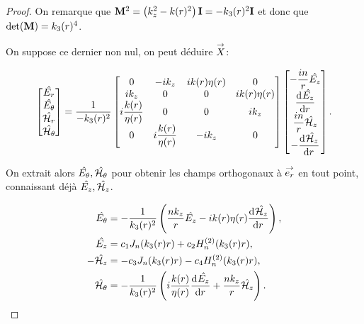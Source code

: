 \begin{proof}
      On remarque que \(\mM^2 = \left(k_z^2 - k(r)^2\right)\mI=-k_3(r)^2\mI\) et donc que \(\det(\mat{M}) = k_3(r)^4\).


      On suppose ce dernier non nul, on peut déduire \(\vect{X}\):

      \begin{equation*}
        \begin{bmatrix}
          \hat{E_r}\\
          \hat{E_\theta}\\
          \hat{\cH_r}\\
          \hat{\cH_\theta}
        \end{bmatrix} =
        \frac{1}{-k_3(r)^2}
        \begin{bmatrix}
        0 & -ik_z & ik(r)\eta(r) & 0
        \\
        ik_z & 0 & 0 & ik(r)\eta(r)
        \\
        i\frac{k(r)}{\eta(r)} & 0 & 0 & ik_z
        \\
        0 & i\frac{k(r)}{\eta(r)} & -ik_z & 0
        \end{bmatrix}
        \begin{bmatrix}
          -\frac{in}{r}\hat{E_z}\\
          \ddp{r}{\hat{E_z}}\\
          \frac{in}{r}\hat{\cH_z}\\
          -\ddp{r}{\hat{\cH_z}}
        \end{bmatrix}.
      \end{equation*}

      On extrait alors \(\hat{E_\theta}, \hat{\cH_\theta}\) pour obtenir les champs orthogonaux à \(\vect{e_r}\) en tout point, connaissant déjà \(\hat{E_z}, \hat{\cH_z}\).

      \begin{align*}
        \hat{E_\theta} &= -\frac{1}{k_3(r)^2}\left(\frac{nk_z}{r}\hat{E_z} - ik(r)\eta(r)\ddp{r}{\hat{\cH_z}}\right),
        \\
        \hat{E_z} &= c_1 J_n(k_3(r) r) + c_2 H_n^{(2)}(k_3(r) r),
        \\
        -\hat{\cH_z} &= -c_3 J_n(k_3(r) r) - c_4 H_n^{(2)}(k_3(r) r),
        \\
        \hat{\cH_\theta} &= -\frac{1}{k_3(r)^2}\left(i\frac{k(r)}{\eta(r)}\ddp{r}{\hat{E_z}} + \frac{nk_z}{r}\hat{\cH_z}\right).
      \end{align*}


\end{proof}
